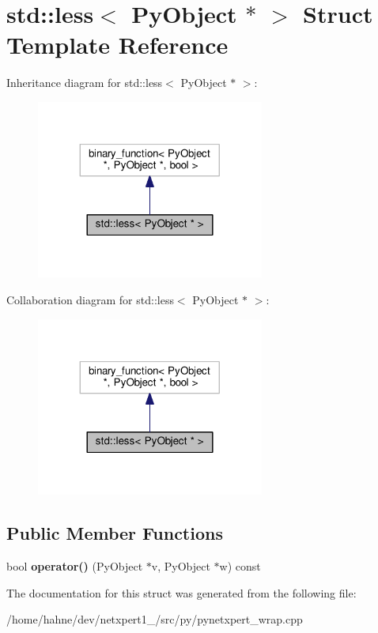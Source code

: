 \hypertarget{structstd_1_1less_3_01PyObject_01_5_01_4}{}\section{std\+:\+:less$<$ Py\+Object $\ast$ $>$ Struct Template Reference}
\label{structstd_1_1less_3_01PyObject_01_5_01_4}


Inheritance diagram for std\+:\+:less$<$ Py\+Object $\ast$ $>$\+:\nopagebreak
\begin{figure}[H]
\begin{center}
\leavevmode
\includegraphics[width=212pt]{structstd_1_1less_3_01PyObject_01_5_01_4__inherit__graph}
\end{center}
\end{figure}


Collaboration diagram for std\+:\+:less$<$ Py\+Object $\ast$ $>$\+:\nopagebreak
\begin{figure}[H]
\begin{center}
\leavevmode
\includegraphics[width=212pt]{structstd_1_1less_3_01PyObject_01_5_01_4__coll__graph}
\end{center}
\end{figure}
\subsection*{Public Member Functions}
\begin{DoxyCompactItemize}
\item 
bool {\bfseries operator()} (Py\+Object $\ast$v, Py\+Object $\ast$w) const \hypertarget{structstd_1_1less_3_01PyObject_01_5_01_4_ac6650a01a6547290d87f57bceade75ed}{}\label{structstd_1_1less_3_01PyObject_01_5_01_4_ac6650a01a6547290d87f57bceade75ed}

\end{DoxyCompactItemize}


The documentation for this struct was generated from the following file\+:\begin{DoxyCompactItemize}
\item 
/home/hahne/dev/netxpert1\+\_/src/py/pynetxpert\+\_\+wrap.\+cpp\end{DoxyCompactItemize}
